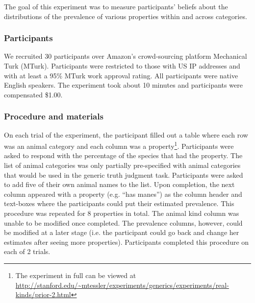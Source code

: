 \documentclass[10pt,letterpaper]{article}
\begin{document}
The goal of this experiment was to measure participants' beliefs about the distributions of the prevalence of various properties within and across categories.

\subsubsection{Participants}

We recruited 30 participants over Amazon's crowd-sourcing platform Mechanical Turk (MTurk).  Participants were restricted to those with US IP addresses and with at least a 95\% MTurk work approval rating. All participants were native English speakers. The experiment took about 10 minutes and participants were compensated \$1.00.

\subsubsection{Procedure and materials}

On each trial of the experiment, the participant filled out a table where each row was an animal category and each column was a property\footnote{The experiment in full can be viewed at \url{http://stanford.edu/~mtessler/experiments/generics/experiments/real-kinds/prior-2.html}}. 
Participants were asked to respond with the percentage of the species that had the property.
The list of animal categories was only partially pre-specified with animal categories that would be used in the generic truth judgment task.
Participants were asked to add five of their own animal names to the list. 
Upon completion, the next column appeared with a property (e.g. ``has manes'') as the column header and text-boxes where the participants could put their estimated prevalence. 
This procedure was repeated for 8 properties in total. 
The animal kind column was unable to be modified once completed. 
The prevalence columns, however, could be modified at a later stage (i.e. the participant could go back and change her estimates after seeing more properties). 
Participants completed this procedure on each of 2 trials.
\end{document}
